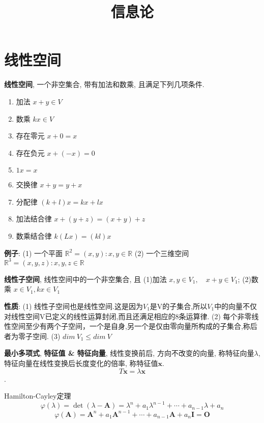 \documentclass{article}
\title{信息论}\date{} \linespread{1.25}
\newcommand{\defi}[2]{\textbf{#1}, #2}
\begin{document}
\tableofcontents




\section{线性空间}
    \defi{线性空间}{一个非空集合, 带有加法和数乘, 且满足下列几项条件.}
        \begin{enumerate}
            \item 加法   $x+y \in V$
            \item 数乘   $k x \in V$
            \item 存在零元 $x+0=x$
            \item 存在负元 $x+(-x) = 0$
            \item $1x = x$
            \item 交换律 $x+y = y+x$
            \item 分配律 $(k+l)x = kx+lx$
            \item 加法结合律 $x+(y+z) = (x+y) +z$
            \item 数乘结合律 $k(Lx) = (kl)x$
        \end{enumerate}

    \textbf{例子}:
        (1) 一个平面 $\mathbb R^2 = {(x,y): x, y\in \mathbb R}$
        (2) 一个三维空间 $\mathbb R^3 = {(x,y,z): x, y, z\in \mathbb R}$

    \defi{线性子空间}{线性空间中的一个非空集合, 且 (1)加法 $x,y\in V_1 ,\quad x+y \in V_1$; (2)数乘 $x \in V_1, k x \in V_1$}

        \textbf{性质}: 
            (1) 线性子空间也是线性空间.这是因为$V_1$是V的子集合,所以$V_1$中的向量不仅对线性空间V已定义的线性运算封闭,而且还满足相应的8条运算律.
            (2) 每个非零线性空间至少有两个子空间，一个是自身,另一个是仅由零向量所构成的子集合,称后者为零子空间.             
            (3) $dim\ V_1 \le dim\ V$


\defi{最小多项式}

\defi{特征值 \& 特征向量}{线性变换前后, 方向不改变的向量, 称特征向量$\lambda$, 特征向量在线性变换后长度变化的倍率, 称特征值$\boldsymbol x$. $$T \boldsymbol x = \lambda \boldsymbol x$$.}

Hamilton-Cayley定理 $$\varphi(\lambda)=\operatorname{det}(\lambda-\boldsymbol{A})=\lambda^{n}+a_{1} \lambda^{n-1}+\cdots+a_{n-1} \lambda+a_{n}$$ $$\varphi(\boldsymbol{A})=\boldsymbol{A}^{n}+a_{1} \boldsymbol{A}^{n-1}+\cdots+a_{n-1} \boldsymbol{A}+a_{n} \boldsymbol{I}=\boldsymbol{O}$$
\end{document}
